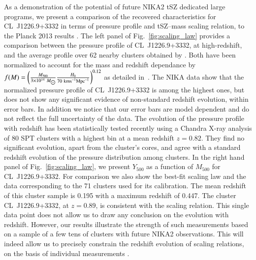 \documentclass[twocolumn,traditabstract]{aa}
\begin{document}
As a demonstration of the potential of future NIKA2 tSZ dedicated large programs, we present a comparison of the recovered characteristics for \mbox{CL~J1226.9+3332} in terms of pressure profile and tSZ--mass scaling relation, to the Planck 2013 results \citep{planck2013pressure_profile,planck2013cluster_count}. The left panel of Fig.~\ref{fig:scaling_law} provides a comparison between the pressure profile of \mbox{CL~J1226.9+3332}, at high-redshift, and the average profile over 62 nearby clusters obtained by \cite{planck2013pressure_profile}. Both have been normalized to account for the mass and redshift dependance by $f(M) = \left(\frac{M_{500}}{3 \times 10^{14} \ M_{\sun}} \frac{H_0}{70 \ {\rm km s}^{-1} {\rm Mpc}^{-1}}\right)^{0.12}$ as detailed in~\cite{planck2013pressure_profile}. The NIKA data show that the normalized pressure profile of \mbox{CL~J1226.9+3332} is among the highest ones, but does not show any significant evidence of non-standard redshift evolution, within error bars. In addition we notice that our error bars are model dependent and do not reflect the full uncertainty of the data. The evolution of the pressure profile with redshift has been statistically tested recently using a Chandra \mbox{X-ray} analysis of 80 SPT clusters \citep{macdonald2014} with a highest bin at a mean redshift $z = 0.82$. They find no significant evolution, apart from the cluster's cores, and agree with a standard redshift evolution of the pressure distribution among clusters. In the right hand panel of Fig.~\ref{fig:scaling_law}, we present $Y_{500}$ as a function of $M_{500}$ for  \mbox{CL~J1226.9+3332}. For comparison we also show the best-fit \citet{planck2013cluster_count} scaling law and the data corresponding to the 71 clusters used for its calibration. The mean redshift of this cluster sample is 0.195 with a maximum redshift of 0.447. The cluster \mbox{CL~J1226.9+3332}, at $z=0.89$, is consistent with the \citet{planck2013cluster_count} scaling relation. This single data point does not allow us to draw any conclusion on the evolution with redshift. However, our results illustrate the strength of such measurements based on a sample of a few tens of clusters with future NIKA2 observations. This will indeed allow us to precisely constrain the redshift evolution of scaling relations, on the basis of individual measurements .

\end{document}
